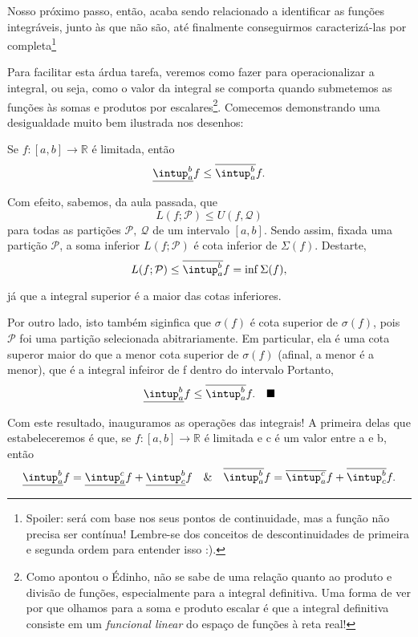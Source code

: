 \documentclass[../analysisII_notes.tex]{subfiles}
\begin{document}
Nosso próximo passo, então, acaba sendo relacionado a identificar as funções integráveis, junto às que não são, até finalmente conseguirmos caracterizá-las por completa\footnote{Spoiler: será com base nos seus pontos de continuidade, mas a função não precisa ser contínua! Lembre-se dos conceitos de descontinuidades de primeira e segunda ordem para entender isso :).}

Para facilitar esta árdua tarefa, veremos como fazer para operacionalizar a integral, ou seja, como o valor da integral se comporta quando submetemos as funções às somas e produtos por escalares\footnote{Como apontou o Édinho, não se sabe de uma relação quanto ao produto e divisão de funções, especialmente para a integral definitiva. Uma forma de ver por que olhamos para a soma e produto escalar é que a integral definitiva consiste em um \textit{funcional linear} do espaço de funções à reta real!}. Comecemos demonstrando uma desigualdade muito bem ilustrada nos desenhos:
\begin{prop*}
	Se \(f:[a, b]\rightarrow \mathbb{R}\) é limitada, então
	\[
		\underline{\intup_{a}^{b}}f \leq \overline{\intup_{a}^{b}}f.
	\]
\end{prop*}
\begin{proof*}
	Com efeito, sabemos, da aula passada, que
	\[
		L(f; \mathcal{P}) \leq U(f, \mathcal{Q})
	\]
	para todas as partições \(\mathcal{P},\: \mathcal{Q}\) de um intervalo \([a, b]\). Sendo assim, fixada uma partição \(\mathcal{P}\), a soma inferior \(L(f; \mathcal{P})\) é cota inferior de \(\Sigma (f)\). Destarte,
	\[
		L(f; \mathcal{P})\leq \overline{\intup_{a}^{b}}f = \inf_{}\Sigma (f),
	\]
	já que a integral superior é a maior das cotas inferiores.

	Por outro lado, isto também siginfica que \(\sigma(f)\) é cota superior de \(\sigma (f)\), pois \(\mathcal{P}\) foi uma partição selecionada abitrariamente. Em particular, ela é uma cota superor maior do que a menor cota superior de \(\sigma (f)\) (afinal, a menor é a menor), que é a integral infeiror de f dentro do intervalo
	Portanto,
	\[
		\underline{\intup_{a}^{b}}f \leq \overline{\intup_{a}^{b}}f.\quad \text{\qedsymbol}
	\]
\end{proof*}
Com este resultado, inauguramos as operações das integrais! A primeira delas que estabeleceremos é que, se \(f:[a, b]\rightarrow \mathbb{R}\) é limitada e c é um valor entre a e b, então
\[
	\underline{\intup_{a}^{b}}f = \underline{\intup_{a}^{c}}f + \underline{\intup_{c}^{b}}f \quad\&\quad \overline{\intup_{a}^{b}}f = \overline{\intup_{a}^{c}}f + \overline{\intup_{c}^{b}}f.
\]
\end{document}
